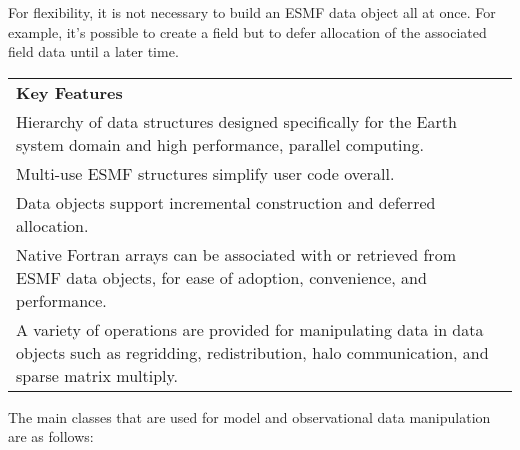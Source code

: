 For flexibility, it is not necessary to build an ESMF data object 
all at once.  For example, it's possible to create a 
field but to defer allocation of the associated field data until 
a later time.


\begin{center}  
\begin{tabular}{|p{6in}|}
\hline
\vspace{.01in}
{\bf Key Features} \\[.01in]
Hierarchy of data structures designed specifically for the Earth 
system domain and high performance, parallel computing. \\
Multi-use ESMF structures simplify user code overall. \\
Data objects support incremental construction and deferred allocation. \\ 
Native Fortran arrays can be associated with or retrieved from ESMF data
objects, for ease of adoption, convenience, and performance. \\
A variety of operations are provided for manipulating data in data objects 
such as regridding, redistribution, halo communication, and sparse matrix multiply.\\[.03in] \hline
\end{tabular}
\end{center}

The main classes that are used for model and observational data manipulation
are as follows:

